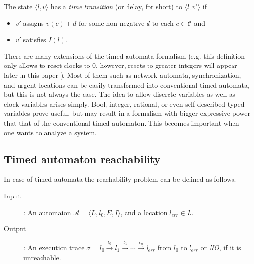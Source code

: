 \begin{dfn}
The state $\langle l,v \rangle$ has a \emph{time transition} (or delay, for short) to $\langle l,v' \rangle$ if
\begin{itemize}
	\item $v'$ assigns $v(c)+d$ for some non-negative $d$ to each $c \in \mathcal{C}$ and
	\item $v'$ satisfies $I(l)$. 
\end{itemize}
\end{dfn}

There are many extensions of the timed automata formalism (e.g. this definition only allows to reset clocks to 0, however, resets to greater integers will appear later in this paper ). Most of them such as network automata, synchronization, and urgent locations can be easily transformed into conventional timed automata, but this is not always the case. The idea to allow discrete variables as well as clock variables arises simply. Bool, integer, rational, or even self-described typed variables prove useful, but may result in a formalism with bigger expressive power that that of the conventional timed automaton. This becomes important when one wants to analyze a system.




\subsection{Timed automaton reachability} \label{sec:tareach}

In case of timed automata the reachability problem can be defined as follows.

\begin{description}
	\item [Input]: An automaton $\mathcal{A}=\langle L, l_0,
	E, I\rangle$, and a location $l_{err} \in L$.
	\item[Output]: An execution trace $\sigma=l_0 \xrightarrow{t_0} l_1 \xrightarrow{t_1} \cdots \xrightarrow{t_n} l_{err}$ from $l_0$ to $l_{err}$ or \emph{NO}, if it is unreachable.
\end{description}

